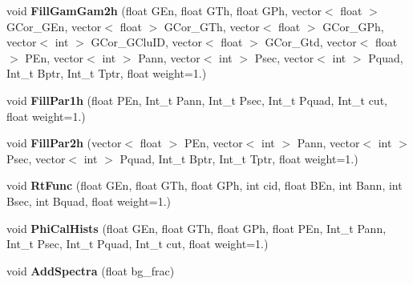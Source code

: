 \begin{DoxyCompactItemize}
\item 
\mbox{\label{classhists_a77c5d523f6064a42098c029ffaa0fbbc}} 
void {\bfseries Fill\+Gam\+Gam2h} (float G\+En, float G\+Th, float G\+Ph, vector$<$ float $>$ G\+Cor\+\_\+\+G\+En, vector$<$ float $>$ G\+Cor\+\_\+\+G\+Th, vector$<$ float $>$ G\+Cor\+\_\+\+G\+Ph, vector$<$ int $>$ G\+Cor\+\_\+\+G\+Clu\+ID, vector$<$ float $>$ G\+Cor\+\_\+\+Gtd, vector$<$ float $>$ P\+En, vector$<$ int $>$ Pann, vector$<$ int $>$ Psec, vector$<$ int $>$ Pquad, Int\+\_\+t Bptr, Int\+\_\+t Tptr, float weight=1.)
\item 
\mbox{\label{classhists_a618651882b77d410480e624dfd4b8ee4}} 
void {\bfseries Fill\+Par1h} (float P\+En, Int\+\_\+t Pann, Int\+\_\+t Psec, Int\+\_\+t Pquad, Int\+\_\+t cut, float weight=1.)
\item 
\mbox{\label{classhists_abdb2e69023e9fdd9080bcef611c26125}} 
void {\bfseries Fill\+Par2h} (vector$<$ float $>$ P\+En, vector$<$ int $>$ Pann, vector$<$ int $>$ Psec, vector$<$ int $>$ Pquad, Int\+\_\+t Bptr, Int\+\_\+t Tptr, float weight=1.)
\item 
\mbox{\label{classhists_a06d98aa7c749ed9aba6b87d403907429}} 
void {\bfseries Rt\+Func} (float G\+En, float G\+Th, float G\+Ph, int cid, float B\+En, int Bann, int Bsec, int Bquad, float weight=1.)
\item 
\mbox{\label{classhists_ab48ef7120a82723ec1db8fde8143d532}} 
void {\bfseries Phi\+Cal\+Hists} (float G\+En, float G\+Th, float G\+Ph, float P\+En, Int\+\_\+t Pann, Int\+\_\+t Psec, Int\+\_\+t Pquad, Int\+\_\+t cut, float weight=1.)
\item 
\mbox{\label{classhists_a52b2233e6775d4a9bf714368101116cb}} 
void {\bfseries Add\+Spectra} (float bg\+\_\+frac)
\end{DoxyCompactItemize}
